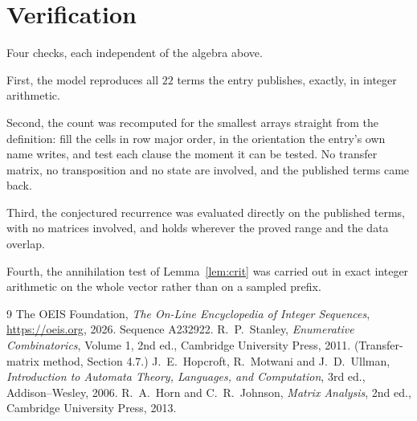 \documentclass[11pt,a4paper]{article}
\theoremstyle{plain}
\theoremstyle{definition}
\begin{document}
\section{Verification}

Four checks, each independent of the algebra above.

First, the model reproduces all $22$ terms the entry publishes, exactly, in integer
arithmetic.

Second, the count was recomputed for the smallest arrays straight from the definition: fill the
cells in row major order, in the orientation the entry's own name writes, and test each clause
the moment it can be tested. No transfer matrix, no transposition and no state are involved,
and the published terms came back.

Third, the conjectured recurrence was evaluated directly on the published terms, with no
matrices involved, and holds wherever the proved range and the data overlap.

Fourth, the annihilation test of Lemma~\ref{lem:crit} was carried out in exact integer
arithmetic on the whole vector rather than on a sampled prefix.

\begin{thebibliography}{9}
 The OEIS Foundation, \emph{The On-Line Encyclopedia of Integer
Sequences}, \url{https://oeis.org}, 2026. Sequence A232922.
 R.~P.~Stanley, \emph{Enumerative Combinatorics}, Volume 1, 2nd ed.,
Cambridge University Press, 2011. (Transfer-matrix method, Section 4.7.)
 J.~E.~Hopcroft, R.~Motwani and J.~D.~Ullman, \emph{Introduction to Automata
Theory, Languages, and Computation}, 3rd ed., Addison--Wesley, 2006.
 R.~A.~Horn and C.~R.~Johnson, \emph{Matrix Analysis}, 2nd ed., Cambridge
University Press, 2013.
\end{thebibliography}
\end{document}

